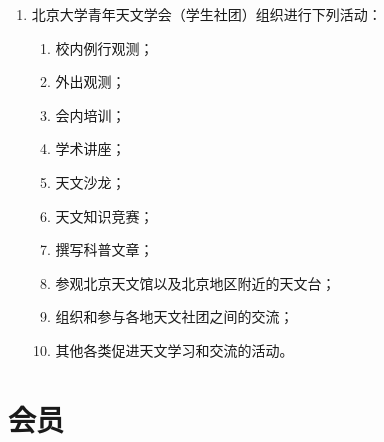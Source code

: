 \begin{enumerate}[resume]
    \item 北京大学青年天文学会（学生社团）组织进行下列活动：
    
    \begin{enumerate}
        \item 校内例行观测；
        \item 外出观测；
        \item 会内培训；
        \item 学术讲座；
        \item 天文沙龙；
        \item 天文知识竞赛；
        \item 撰写科普文章；
        \item 参观北京天文馆以及北京地区附近的天文台；
        \item 组织和参与各地天文社团之间的交流；
        \item 其他各类促进天文学习和交流的活动。
    \end{enumerate}
    
\end{enumerate}

\section{会员}

